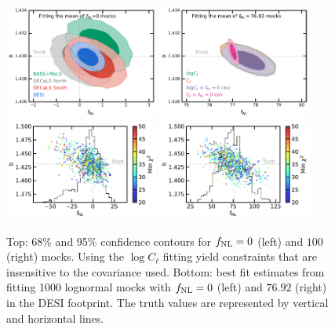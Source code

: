 \begin{figure}
    \centering
    \includegraphics[width=0.45\textwidth]{figures/mcmc_zero.pdf} 
    \includegraphics[width=0.45\textwidth]{figures/mcmc_po100.pdf} 
    \includegraphics[width=0.45\textwidth]{figures/bestfit_zero.pdf} 
    \includegraphics[width=0.45\textwidth]{figures/bestfit_po100.pdf}         
    \caption{Top: 68\% and 95\% confidence contours for $f_{\rm NL}=0$ (left) and $100$ (right) mocks. Using the $\log C_{\ell}$ fitting yield constraints that are insensitive to the covariance used. Bottom: best fit estimates from fitting 1000 lognormal mocks with $f_{\rm NL}=0$ (left) and $76.92$ (right) in the DESI footprint. The truth values are represented by vertical and horizontal lines.}\label{fig:mcmc_mocks}
\end{figure}





